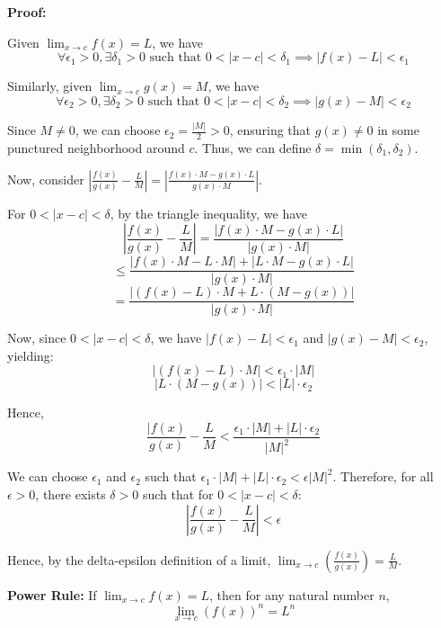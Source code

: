 \textbf{Proof:} \begin{outline}
Given $\lim_{x \to c} f(x) = L$, we have
\[ \forall \epsilon_1 > 0, \exists \delta_1 > 0 \text{ such that } 0 < |x - c| < \delta_1 \implies |f(x) - L| < \epsilon_1 \]

Similarly, given $\lim_{x \to c} g(x) = M$, we have
\[ \forall \epsilon_2 > 0, \exists \delta_2 > 0 \text{ such that } 0 < |x - c| < \delta_2 \implies |g(x) - M| < \epsilon_2 \]

Since $M \neq 0$, we can choose $\epsilon_2 = \frac{|M|}{2} > 0$, ensuring that $g(x) \neq 0$ in some punctured neighborhood around $c$. Thus, we can define $\delta = \min(\delta_1, \delta_2)$.

Now, consider $\left|\frac{f(x)}{g(x)} - \frac{L}{M}\right| = \left|\frac{f(x) \cdot M - g(x) \cdot L}{g(x) \cdot M}\right|$.

For $0 < |x - c| < \delta$, by the triangle inequality, we have
\[ \left|\frac{f(x)}{g(x)} - \frac{L}{M}\right| = \frac{|f(x) \cdot M - g(x) \cdot L|}{|g(x) \cdot M|} \]
\[ \leq \frac{|f(x) \cdot M - L \cdot M| + |L \cdot M - g(x) \cdot L|}{|g(x) \cdot M|} \]
\[ = \frac{|(f(x) - L) \cdot M + L \cdot (M - g(x))|}{|g(x) \cdot M|} \]

Now, since $0 < |x - c| < \delta$, we have $|f(x) - L| < \epsilon_1$ and $|g(x) - M| < \epsilon_2$, yielding:
\[ |(f(x) - L) \cdot M| < \epsilon_1 \cdot |M| \]
\[ |L \cdot (M - g(x))| < |L| \cdot \epsilon_2 \]

Hence,
\[ \frac{|f(x)}{g(x)} - \frac{L}{M} < \frac{\epsilon_1 \cdot |M| + |L| \cdot \epsilon_2}{|M|^2} \]

We can choose $\epsilon_1$ and $\epsilon_2$ such that $\epsilon_1 \cdot |M| + |L| \cdot \epsilon_2 < \epsilon|M|^2$. Therefore, for all $\epsilon > 0$, there exists $\delta > 0$ such that for $0 < |x - c| < \delta$:
\[ \left|\frac{f(x)}{g(x)} - \frac{L}{M}\right| < \epsilon \]

Hence, by the delta-epsilon definition of a limit, $\lim_{x \to c} \left(\frac{f(x)}{g(x)}\right) = \frac{L}{M}$.

\end{outline} \vspace{1cm} \hline

\textbf{Power Rule:} If $\lim_{x \to c} f(x) = L$, then for any natural number $n$,
\[ \lim_{x \to c} (f(x))^n = L^n \]

